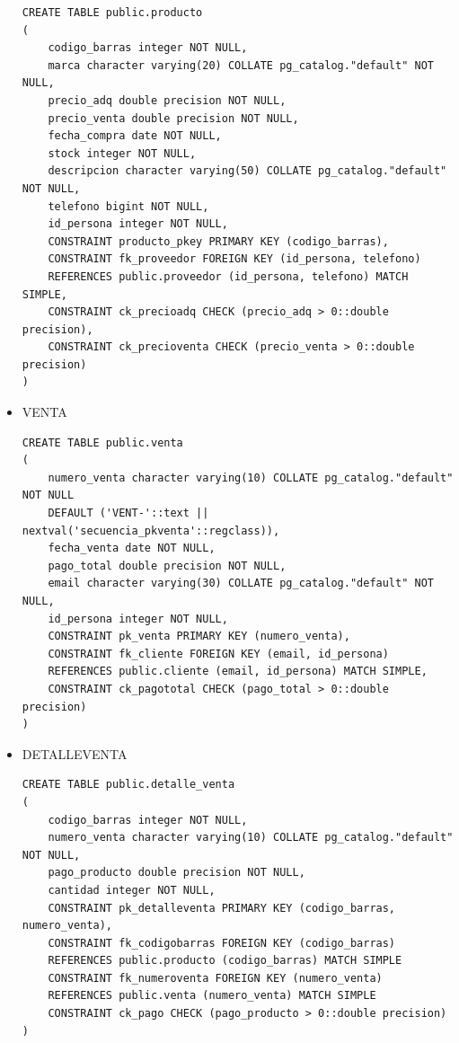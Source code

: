 \documentclass{article}
\begin{document}
\begin{itemize}
\begin{lstlisting}
CREATE TABLE public.producto
(
	codigo_barras integer NOT NULL,
	marca character varying(20) COLLATE pg_catalog."default" NOT NULL,
	precio_adq double precision NOT NULL,
	precio_venta double precision NOT NULL,
	fecha_compra date NOT NULL,
	stock integer NOT NULL,
	descripcion character varying(50) COLLATE pg_catalog."default" NOT NULL,
	telefono bigint NOT NULL,
	id_persona integer NOT NULL,
	CONSTRAINT producto_pkey PRIMARY KEY (codigo_barras),
	CONSTRAINT fk_proveedor FOREIGN KEY (id_persona, telefono)
	REFERENCES public.proveedor (id_persona, telefono) MATCH SIMPLE,
	CONSTRAINT ck_precioadq CHECK (precio_adq > 0::double precision),
	CONSTRAINT ck_precioventa CHECK (precio_venta > 0::double precision)
)
\end{lstlisting}

\item VENTA\\

\begin{lstlisting}
CREATE TABLE public.venta
(
	numero_venta character varying(10) COLLATE pg_catalog."default" NOT NULL 
	DEFAULT ('VENT-'::text || nextval('secuencia_pkventa'::regclass)),
	fecha_venta date NOT NULL,
	pago_total double precision NOT NULL,
	email character varying(30) COLLATE pg_catalog."default" NOT NULL,
	id_persona integer NOT NULL,
	CONSTRAINT pk_venta PRIMARY KEY (numero_venta),
	CONSTRAINT fk_cliente FOREIGN KEY (email, id_persona)
	REFERENCES public.cliente (email, id_persona) MATCH SIMPLE,
	CONSTRAINT ck_pagototal CHECK (pago_total > 0::double precision)
)
\end{lstlisting}

\item DETALLE\textunderscore VENTA\\

\begin{lstlisting}
CREATE TABLE public.detalle_venta
(
	codigo_barras integer NOT NULL,
	numero_venta character varying(10) COLLATE pg_catalog."default" NOT NULL,
	pago_producto double precision NOT NULL,
	cantidad integer NOT NULL,
	CONSTRAINT pk_detalleventa PRIMARY KEY (codigo_barras, numero_venta),
	CONSTRAINT fk_codigobarras FOREIGN KEY (codigo_barras)
	REFERENCES public.producto (codigo_barras) MATCH SIMPLE
	CONSTRAINT fk_numeroventa FOREIGN KEY (numero_venta)
	REFERENCES public.venta (numero_venta) MATCH SIMPLE
	CONSTRAINT ck_pago CHECK (pago_producto > 0::double precision)
)
\end{lstlisting}
\end{itemize}
\end{document}
